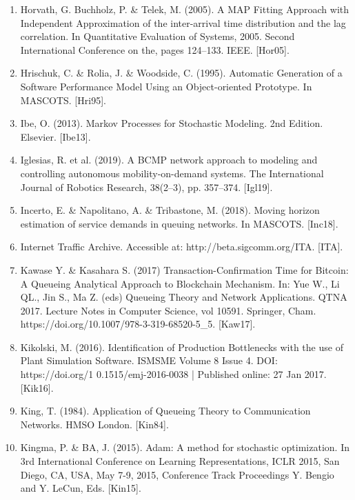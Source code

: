 \documentclass[a4paper,11pt,titlepage]{article}
\begin{document}
\begin{enumerate}
\item Horvath, G. Buchholz, P. & Telek, M. (2005). A MAP Fitting Approach with
Independent Approximation of the inter-arrival time distribution and the lag correlation. In Quantitative Evaluation of Systems, 2005. Second International Conference on the, pages 124–133. IEEE. [Hor05].

\item Hrischuk, C. & Rolia, J. & Woodside, C. (1995). Automatic Generation of a Software Performance Model
Using an Object-oriented Prototype. In MASCOTS. [Hri95].

\item Ibe, O. (2013). Markov Processes for Stochastic Modeling. 2nd Edition. Elsevier. [Ibe13].

\item Iglesias, R. et al. (2019). A BCMP network approach to modeling and controlling autonomous mobility-on-demand systems. The International Journal of Robotics Research, 38(2–3), pp. 357–374. [Igl19].

\item Incerto, E. & Napolitano, A. & Tribastone, M. (2018). Moving horizon estimation of service demands in queuing networks. In MASCOTS. [Inc18]. 

\item Internet Traffic Archive. Accessible at: http://beta.sigcomm.org/ITA. [ITA]. 

\item Kawase Y. & Kasahara S. (2017) Transaction-Confirmation Time for Bitcoin: A Queueing Analytical Approach to Blockchain Mechanism. In: Yue W., Li QL., Jin S., Ma Z. (eds) Queueing Theory and Network Applications. QTNA 2017. Lecture Notes in Computer Science, vol 10591. Springer, Cham. https://doi.org/10.1007/978-3-319-68520-5\_5. [Kaw17].

\item Kikolski, M. (2016). Identification of Production Bottlenecks with the use of Plant Simulation Software. ISMSME Volume 8 Issue 4. DOI: https://doi.org/1
0.1515/emj-2016-0038 | Published online: 27 Jan 2017. [Kik16]. 

\item King, T. (1984). Application of Queueing Theory to Communication Networks. HMSO London. [Kin84].

\item Kingma, P. & BA, J. (2015). Adam: A method for stochastic optimization. In 3rd International Conference on Learning Representations, ICLR 2015, San Diego, CA, USA, May 7-9, 2015, Conference Track Proceedings Y. Bengio and Y. LeCun, Eds. [Kin15]. 


\end{enumerate}
\end{document}
